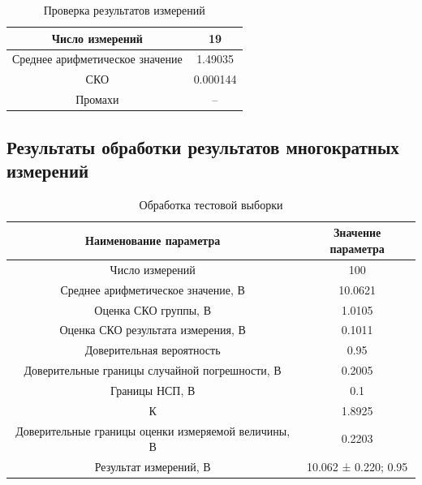 \documentclass[a4paper,14pt]{article}
\begin{document}
\begin{table}[H]
	\centering
	\caption{Проверка результатов измерений }
	\label{tab:grubbs_train}
	\begin{tabular}{|c|c|}
		\hline
		Число измерений                 & 19       \\ \hline
		Среднее арифметическое значение & 1.49035  \\ \hline
		СКО                             & 0.000144 \\ \hline
		Промахи                         & --       \\ \hline
	\end{tabular}
\end{table}

\subsection{Результаты обработки результатов многократных измерений}

\begin{table}[H]
	\centering
	\caption{Обработка тестовой выборки }
	\label{tab:mm_test}
	\begin{tabular}{|c|c|}
		\hline
		              Наименование параметра                &  Значение параметра  \\ \hline
		                  Число измерений                   &         100          \\ \hline
		        Среднее арифметическое значение, В          &       10.0621        \\ \hline
		               Оценка СКО группы, В                 &        1.0105        \\ \hline
		        Оценка СКО результата измерения, В          &        0.1011        \\ \hline
		             Доверительная вероятность              &         0.95         \\ \hline
		  Доверительные границы случайной погрешности, В    &        0.2005        \\ \hline
		                  Границы НСП, В                    &         0.1          \\ \hline
		                         К                          &        1.8925        \\ \hline
		Доверительные границы оценки измеряемой величины, В &        0.2203        \\ \hline
		              Результат измерений, В                & 10.062 ± 0.220; 0.95 \\ \hline
	\end{tabular}
\end{table}
\end{document}
